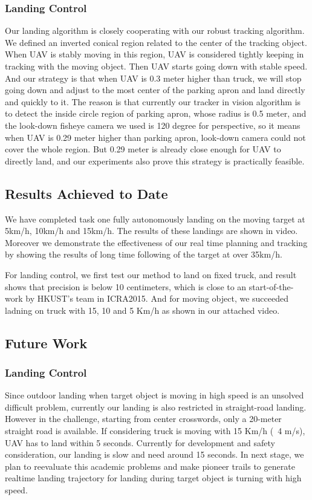 \documentclass{standalone}
\begin{document}
\subsubsection{Landing Control}
Our landing algorithm is closely cooperating with our robust tracking algorithm. We defined an inverted conical region related to the center of the tracking object. When UAV is stably moving in this region, UAV is considered tightly keeping in tracking with the moving object. Then UAV starts going down with stable speed. And our strategy is that when UAV is 0.3 meter higher than truck, we will stop going down and adjust to the most center of the parking apron and land directly and quickly to it. The reason is that currently our tracker in vision algorithm is to detect the inside circle region of parking apron, whose radius is 0.5 meter, and the look-down fisheye camera we used is 120 degree for perspective, so it means when UAV is 0.29 meter higher than parking apron, look-down camera could not cover the whole region. But 0.29 meter is already close enough for UAV to directly land, and our experiments also prove this strategy is practically feasible.


\subsection{Results Achieved to Date}

We have completed task one fully autonomously landing on the moving
target at 5km/h, 10km/h and 15km/h. The results of these landings are
shown in video. Moreover we demonstrate the effectiveness of our real
time planning and tracking by showing the results of long time
following of the target at over 35km/h.

For landing control, we first test our method to land on fixed truck, and result shows that precision is below 10 centimeters, which is close to an start-of-the-work by HKUST's team in ICRA2015. And for moving object, we succeeded ladning on truck with 15, 10 and 5 Km/h as shown in our attached video.

\subsection{Future Work}
\subsubsection{Landing Control}
Since outdoor landing when target object is moving in high speed is an unsolved difficult problem, currently our landing is also restricted in straight-road landing. However in the challenge, starting from center crosswords, only a 20-meter straight road is available. If considering truck is moving with 15 Km/h (~4 m/s), UAV has to land within 5 seconds. Currently for development and safety consideration, our landing is slow and need around 15 seconds.
In next stage, we plan to reevaluate this academic problems and make pioneer trails to generate realtime landing trajectory for landing during target object is turning with high speed.
\end{document}
